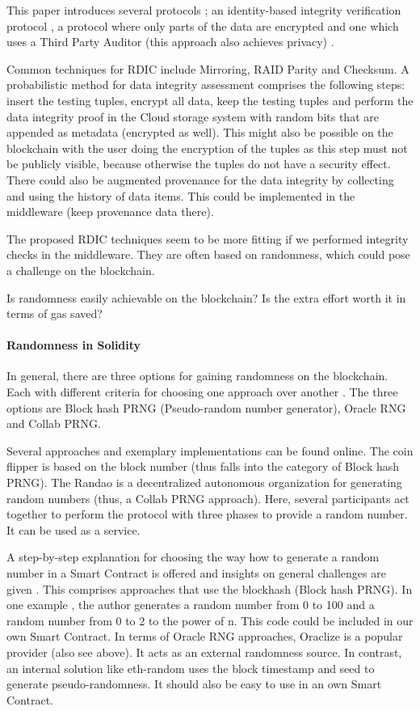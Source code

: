 This paper introduces several protocols \cite{relatedWork17}; an identity-based integrity verification protocol \cite{relatedWork18}, a protocol where only parts of the data are encrypted \cite{relatedWork19} and one which uses a Third Party Auditor (this approach also achieves privacy) \cite{relatedWork20}.

Common techniques for RDIC include Mirroring, RAID Parity and Checksum. A probabilistic method for data integrity assessment comprises the following steps: insert the testing tuples, encrypt all data, keep the testing tuples and perform the data integrity proof in the Cloud storage system with random bits that are appended as metadata (encrypted as well).
This might also be possible on the blockchain with the user doing the encryption of the tuples as this step must not be publicly visible, because otherwise the tuples do not have a security effect. There could also be augmented provenance for the data integrity by collecting and using the history of data items. This could be implemented in the middleware (keep provenance data there). \cite{relatedWork21}

The proposed RDIC techniques seem to be more fitting if we performed integrity checks in the middleware. They are often based on randomness, which could pose a challenge on the blockchain.

Is randomness easily achievable on the blockchain? Is the extra effort worth it in terms of gas saved?

\paragraph{Randomness in Solidity}
In general, there are three options for gaining randomness on the blockchain. Each with different criteria for choosing one approach over another \cite{relatedWork22}. The three options are Block hash PRNG (Pseudo-random number generator), Oracle RNG and Collab PRNG.

Several approaches and exemplary implementations can be found online.
The coin flipper \cite{relatedWork23} is based on the block number (thus falls into the category of Block hash PRNG). The Randao \cite{relatedWork24} is a decentralized autonomous organization for generating random numbers (thus, a Collab PRNG approach). Here, several participants act together to perform the protocol with three phases to provide a random number. It can be used as a service.

A step-by-step explanation for choosing the way how to generate a random number in a Smart Contract is offered and insights on general challenges are given \cite{relatedWork25}. This comprises approaches that use the blockhash (Block hash PRNG).
In one example \cite{relatedWork26}, the author generates a random number from 0 to 100 and a random number from 0 to 2 to the power of n. This code could be included in our own Smart Contract.
In terms of Oracle RNG approaches, Oraclize \cite{relatedWork07} is a popular provider (also see above). It acts as an external randomness source.
In contrast, an internal solution like eth-random \cite{relatedWork27} uses the block timestamp and seed to generate pseudo-randomness. It should also be easy to use in an own Smart Contract.

